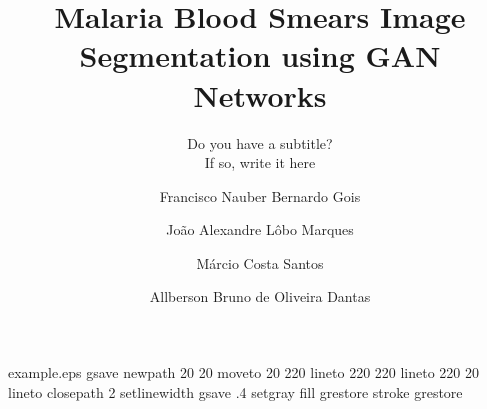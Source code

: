 %
%
%
%
%
\begin{filecontents*}{example.eps}
gsave
newpath
  20 20 moveto
  20 220 lineto
  220 220 lineto
  220 20 lineto
closepath
2 setlinewidth
gsave
  .4 setgray fill
grestore
stroke
grestore
\end{filecontents*}
%
\RequirePackage{fix-cm}
%
\documentclass[twocolumn]{svjour3}          %
%
\smartqed  %
%
\usepackage{graphicx}
\usepackage[table,xcdraw]{xcolor}
%
%
%
%
%


\title{Malaria Blood Smears Image Segmentation using GAN Networks}
\subtitle{Do you have a subtitle?\\ If so, write it here}


\author{Francisco Nauber Bernardo Gois         \and
        João Alexandre Lôbo Marques \and
        Márcio Costa Santos   \and
        Allberson Bruno de Oliveira Dantas \and 
}



